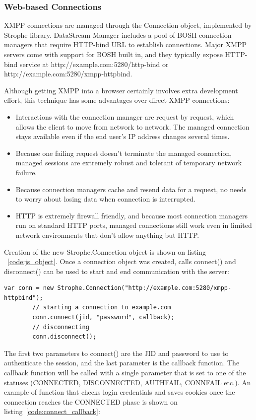 	\subsubsection{Web-based Connections}
	XMPP connections are managed through the Connection object, implemented by Strophe library. DataStream Manager includes a pool of BOSH connection managers that require HTTP-bind URL to establish connections. Major XMPP servers come with support for BOSH built in, and they typically expose HTTP-bind service at http://example.com:5280/http-bind or http://example.com:5280/xmpp-httpbind.

	Although getting XMPP into a browser certainly involves extra development effort, this technique has some advantages over direct XMPP connections:
	\begin{itemize}
	\item Interactions with the connection manager are request by request, which allows the client to move from network to network. The managed connection stays available even if the end user's IP address changes several times.
	\item Because one failing request doesn't terminate the managed connection, managed sessions are extremely robust and tolerant of temporary network failure.
	\item Because connection managers cache and resend data for a request, no needs to worry about losing data when connection is interrupted.
	\item HTTP is extremely firewall friendly, and because most connection managers run on standard HTTP ports, managed connections still work even in limited network environments that don’t allow anything but HTTP.
	\end{itemize}

	Creation of the new Strophe.Connection object is shown on listing ~\ref{code:js_object}. Once a connection object was created, calls connect() and disconnect() can be used to start and end communication with the server:

	    \begin{lstlisting}[label=code:js_object,caption=Stanzas Format]
		var conn = new Strophe.Connection("http://example.com:5280/xmpp-httpbind");
		// starting a connection to example.com
		conn.connect(jid, "password", callback);
		// disconnecting
		conn.disconnect();
	    \end{lstlisting}

	The first two parameters to connect() are the JID and password to use to authenticate the session, and the last parameter is the callback function. The callback function will be called with a single parameter that is set to one of the statuses (CONNECTED, DISCONNECTED, AUTHFAIL, CONNFAIL etc.). An example of function that checks login credentials and saves cookies once the connection reaches the CONNECTED phase is shown on listing~\ref{code:connect_callback}: 

